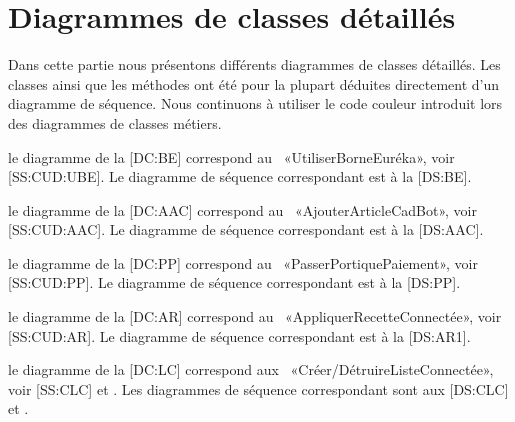 \chapter[CH:CT]{Diagrammes de classes détaillés}

Dans cette partie nous présentons différents diagrammes de classes détaillés.
Les classes ainsi que les méthodes ont été pour la plupart déduites directement d'un diagramme de séquence.
Nous continuons à utiliser le code couleur introduit lors des diagrammes de classes métiers.

\startitemize
\item le diagramme de la [DC:BE] correspond au \cu\ «UtiliserBorneEuréka», voir [SS:CUD:UBE].
Le diagramme de séquence correspondant est à la [DS:BE].

\item le diagramme de la [DC:AAC] correspond au \cu\ «AjouterArticleCadBot», voir [SS:CUD:AAC].
Le diagramme de séquence correspondant est à la [DS:AAC].

\item le diagramme de la [DC:PP] correspond au \cu\ «PasserPortiquePaiement», voir [SS:CUD:PP].
Le diagramme de séquence correspondant est à la [DS:PP].

\item le diagramme de la [DC:AR] correspond au \cu\ «AppliquerRecetteConnectée», voir [SS:CUD:AR].
Le diagramme de séquence correspondant est à la [DS:AR1].

\item le diagramme de la [DC:LC] correspond aux \cu\ «Créer/DétruireListeConnectée», voir [SS:CLC] et \in[SS:DLC].
Les diagrammes de séquence correspondant sont aux [DS:CLC] et \in[DS:DLC].

\stopitemize

{}

{}

{}

{}

{}

